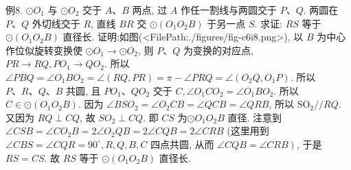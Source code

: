 例8. $\odot O_1$ 与 $\odot O_2$ 交于 $A 、 B$ 两点, 过 $A$ 作任一割线与两圆交于 $P 、 Q$. 两圆在 $P 、 Q$ 外切线交于 $R$, 直线 $B R$ 交 $\odot\left(O_1 O_2 B\right)$ 于另一点 $S$. 求证: $R S$ 等于 $\odot\left(O_1 O_2 B\right)$ 直径长.
证明:如图(<FilePath:./figures/fig-c6i8.png>), 以 $B$ 为中心作位似旋转变换使 $\odot O_1 \rightarrow \odot O_2$, 则 $P 、 Q$ 为变换的对应点, $P R \rightarrow R Q, P O_1 \rightarrow Q O_2$.
所以 $\angle P B Q=\angle O_1 B O_2=\angle(R Q, P R)= \pi-\angle P R Q=\angle\left(O_2 Q, O_1 P\right)$.
所以 $P 、 R 、 Q 、 B$ 共圆, 且 $P O_1 、 Q O_2$ 交于 $C, \angle O_1 C O_2=\angle O_1 B O_2$.
所以 $C \in \odot\left(O_1 O_2 B\right)$.
因为 $\angle B S O_2=\angle O_2 C B=\angle Q C B= \angle Q R B$, 所以 $\mathrm{SO}_2 / / R Q$.
又因为 $R Q \perp C Q$, 故 $S O_2 \perp C Q$. 即 $C S$ 为$\odot O_1 O_2 B$ 直径.
注意到 $\angle C S B=\angle C O_2 B=2 \angle O_2 Q B=2 \angle C Q B=2 \angle C R B$ (这里用到 $\angle C B S=\angle C Q R=90^{\circ}, R, Q, B, C$ 四点共圆, 从而 $\left.\angle C Q B=\angle C R B\right)$, 于是 $R S=C S$.
故 $R S$ 等于 $\odot\left(O_1 O_2 B\right)$ 直径长.


